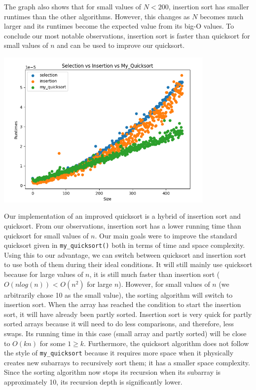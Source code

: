 \documentclass{article}
\begin{document}
The graph also shows that for small values of $N < 200$, insertion sort has smaller runtimes than the other algorithms. However, this changes as $N$ becomes much larger and its runtimes become the expected value from its big-O values. To conclude our most notable observations, insertion sort is faster than quicksort for small values of $n$ and can be used to improve our quicksort.

\includegraphics[width=0.8\textwidth]{elementarySortsComparisons}

Our implementation of an improved quicksort is a hybrid of insertion sort and quicksort. From our observations, insertion sort has a lower running time than quicksort for small values of $n$. Our main goals were to improve the standard quicksort given in \verb|my_quicksort()| both in terms of time and space complexity. Using this to our advantage, we can switch between quicksort and insertion sort to use both of them during their ideal conditions. It will still mainly use quicksort because for large values of $n$, it is still much faster than insertion sort ($O(nlog(n))$ < $O(n^2)$ for large $n$). However, for small values of $n$ (we arbitrarily chose 10 as the small value), the sorting algorithm will switch to insertion sort. When the array has reached the condition to start the insertion sort, it will have already been partly sorted. Insertion sort is very quick for partly sorted arrays because it will need to do less comparisons, and therefore, less swaps. Its running time in this case (small array and partly sorted) will be close to $O(kn)$ for some $1 \geq k$. Furthermore, the quicksort algorithm does not follow the style of \verb|my_quicksort| because it requires more space when it physically creates new subarrays to recursively sort them; it has a smaller space complexity. Since the sorting algorithm now stops its recursion when its subarray is approximately 10,  its recursion depth is significantly lower. 
\end{document}
